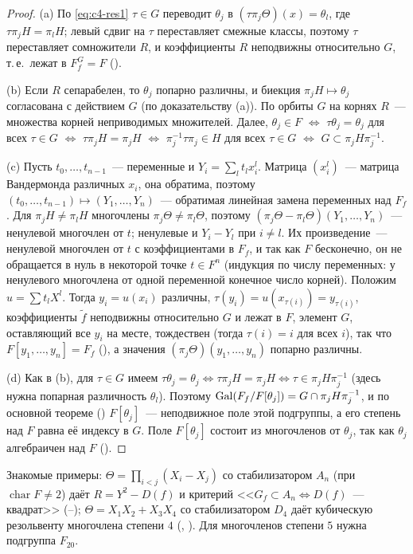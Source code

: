 \begin{proof}
(a) По \eqref{eq:c4-res1} $\tau\in G$ переводит $\theta_j$ в $(\tau\pi_j\Theta)(x)=\theta_l$, где $\tau\pi_jH=\pi_lH$; левый сдвиг на
$\tau$ переставляет смежные классы, поэтому $\tau$ переставляет сомножители $R$, и коэффициенты $R$ неподвижны
относительно $G$, т.\,е.\ лежат в $F_f^G=F$ ().

(b) Если $R$ сепарабелен, то $\theta_j$ попарно различны, и биекция $\pi_jH\mapsto\theta_j$ согласована с действием $G$
(по доказательству (a)). По  орбиты $G$ на корнях $R$~--- множества корней неприводимых множителей. Далее,
$\theta_j\in F$ $\iff$ $\tau\theta_j=\theta_j$ для всех $\tau\in G$ $\iff$ $\tau\pi_jH=\pi_jH$ $\iff$ $\pi_j^{-1}\tau\pi_j\in H$ для
всех $\tau\in G$ $\iff$ $G\subset\pi_jH\pi_j^{-1}$.

(c) Пусть $t_0,\dots,t_{n-1}$~--- переменные и $Y_i=\sum_lt_lx_i^l$. Матрица $(x_i^l)$~--- матрица Вандермонда различных
$x_i$, она обратима, поэтому $(t_0,\dots,t_{n-1})\mapsto(Y_1,\dots,Y_n)$~--- обратимая линейная замена переменных над $F_f$. Для
$\pi_jH\ne\pi_lH$ многочлены $\pi_j\Theta\ne\pi_l\Theta$, поэтому $(\pi_j\Theta-\pi_l\Theta)(Y_1,\dots,Y_n)$~--- ненулевой многочлен
от $t$; ненулевые и $Y_i-Y_l$ при $i\ne l$. Их произведение~--- ненулевой многочлен от $t$ с коэффициентами в $F_f$, и
так как $F$ бесконечно, он не обращается в нуль в некоторой точке $t\in F^n$ (индукция по числу переменных: у
ненулевого многочлена от одной переменной конечное число корней). Положим $u=\sum t_lX^l$. Тогда $y_i=u(x_i)$ различны,
$\tau(y_i)=u(x_{\tau(i)})=y_{\tau(i)}$, коэффициенты $\tilde f$ неподвижны относительно $G$ и лежат в $F$, элемент $G$,
оставляющий все $y_i$ на месте, тождествен (тогда $\tau(i)=i$ для всех $i$), так что $F[y_1,\dots,y_n]=F_f$ (), а значения
$(\pi_j\Theta)(y_1,\dots,y_n)$ попарно различны.

(d) Как в (b), для $\tau\in G$ имеем $\tau\theta_j=\theta_j\iff\tau\pi_jH=\pi_jH\iff\tau\in\pi_jH\pi_j^{-1}$ (здесь нужна
попарная различность $\theta_l$). Поэтому $\operatorname{Gal}(F_f/F[\theta_j])=G\cap\pi_jH\pi_j^{-1}$, и по основной теореме ()
$F[\theta_j]$~--- неподвижное поле этой подгруппы, а его степень над $F$ равна её индексу в $G$. Поле $F[\theta_j]$
состоит из многочленов от $\theta_j$, так как $\theta_j$ алгебраичен над $F$ ().
\end{proof}

Знакомые примеры: $\Theta=\prod_{i<j}(X_i-X_j)$ со стабилизатором $A_n$ (при $\operatorname{char}F\ne2$) даёт $R=Y^2-D(f)$ и
критерий <<$G_f\subset A_n\iff D(f)$~--- квадрат>> (--); $\Theta=X_1X_2+X_3X_4$ со стабилизатором $D_4$ даёт
кубическую резольвенту многочлена степени $4$ (, ). Для многочленов степени $5$ нужна подгруппа $F_{20}$.

